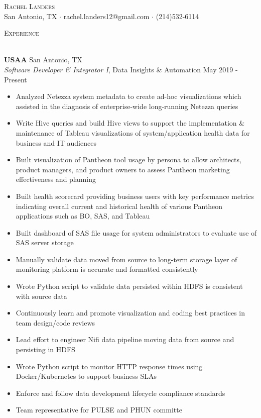 \documentclass[a4paper]{article}
\newcommand{\lineunder} {
    \vspace*{-8pt} \\
    \hspace*{-18pt} \hrulefill \\
}
\newcommand{\header} [1] {
    {\hspace*{-18pt}\vspace*{6pt} \textsc{#1}}
    \vspace*{-6pt} \lineunder
}
\begin{document}
\vspace*{-10pt}

    

\vspace*{-40pt}
\begin{center}
	{\Huge \scshape {Rachel Landers}}\\
	San Antonio, TX $\cdot$ rachel.landers12@gmail.com $\cdot$ (214)532-6114\\
\end{center}

\header{Experience}
\vspace{1mm}

\textbf{USAA} \hfill San Antonio, TX\\
\textit{Software Developer \& Integrator I}, Data Insights \& Automation \hfill May 2019 - Present\\
\vspace{-1mm}
\begin{itemize} \itemsep .5pt
	\item Analyzed Netezza system metadata to create ad-hoc visualizations which assisted in the diagnosis of enterprise-wide long-running Netezza queries
        \item Write Hive queries and build Hive views to support the implementation \& maintenance of Tableau visualizations of system/application health data for business and IT audiences
	\item Built visualization of Pantheon tool usage by persona to allow architects, product managers, and product owners to assess Pantheon marketing effectiveness and planning
	\item Built health scorecard providing business users with key performance metrics indicating overall current and historical health of various Pantheon applications such as BO, SAS, and Tableau
	\item Built dashboard of SAS file usage for system administrators to evaluate use of SAS server storage
        \item Manually validate data moved from source to long-term storage layer of monitoring platform is accurate and formatted consistently
        \item Wrote Python script to validate data persisted within HDFS is consistent with source data
        \item Continuously learn and promote visualization and coding best practices in team design/code reviews
        \item Lead effort to engineer Nifi data pipeline moving data from source and persisting in HDFS
        \item Wrote Python script to monitor HTTP response times using Docker/Kubernetes to support business SLAs
        \item Enforce and follow data development lifecycle compliance standards
	\item Team representative for PULSE and PHUN committe
\end{itemize}
\end{document}
